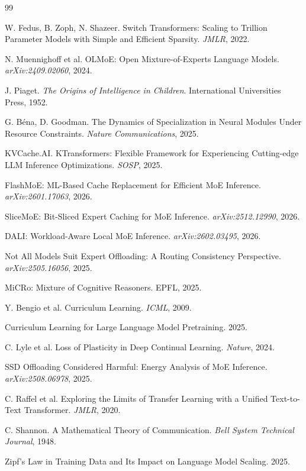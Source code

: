 \documentclass{article}
\begin{document}
\begin{thebibliography}{99}

W. Fedus, B. Zoph, N. Shazeer. Switch Transformers: Scaling to Trillion Parameter Models with Simple and Efficient Sparsity. \textit{JMLR}, 2022.

N. Muennighoff et al. OLMoE: Open Mixture-of-Experts Language Models. \textit{arXiv:2409.02060}, 2024.

J. Piaget. \textit{The Origins of Intelligence in Children}. International Universities Press, 1952.

G. Béna, D. Goodman. The Dynamics of Specialization in Neural Modules Under Resource Constraints. \textit{Nature Communications}, 2025.

KVCache.AI. KTransformers: Flexible Framework for Experiencing Cutting-edge LLM Inference Optimizations. \textit{SOSP}, 2025.

FlashMoE: ML-Based Cache Replacement for Efficient MoE Inference. \textit{arXiv:2601.17063}, 2026.

SliceMoE: Bit-Sliced Expert Caching for MoE Inference. \textit{arXiv:2512.12990}, 2026.

DALI: Workload-Aware Local MoE Inference. \textit{arXiv:2602.03495}, 2026.

Not All Models Suit Expert Offloading: A Routing Consistency Perspective. \textit{arXiv:2505.16056}, 2025.

MiCRo: Mixture of Cognitive Reasoners. EPFL, 2025.

Y. Bengio et al. Curriculum Learning. \textit{ICML}, 2009.

Curriculum Learning for Large Language Model Pretraining. 2025.

C. Lyle et al. Loss of Plasticity in Deep Continual Learning. \textit{Nature}, 2024.

SSD Offloading Considered Harmful: Energy Analysis of MoE Inference. \textit{arXiv:2508.06978}, 2025.

C. Raffel et al. Exploring the Limits of Transfer Learning with a Unified Text-to-Text Transformer. \textit{JMLR}, 2020.

C. Shannon. A Mathematical Theory of Communication. \textit{Bell System Technical Journal}, 1948.

Zipf's Law in Training Data and Its Impact on Language Model Scaling. 2025.

\end{thebibliography}
\end{document}
